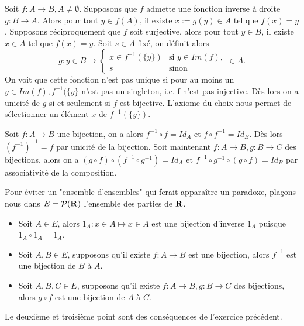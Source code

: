 \begin{exercice}
    Soit $f : A \to B, A \neq \emptyset$.
    Supposons que $f$ admette une fonction inverse à droite $g : B \to A$. Alors pour tout $y \in f(A)$, il existe 
    $x := g(y) \in A$ tel que $f(x) = y$. Supposons réciproquement que $f$ soit surjective, alors pour tout $y \in B$, il
    existe $x \in A$ tel que $f(x) = y$. Soit $s \in A$ fixé, on définit alors 
    \[
        g : y \in B \mapsto 
        \begin{cases}
            x \in f^{-1}(\{y\}) & \text{si } y \in Im(f),\\
            s & \text{sinon}
        \end{cases} \in A.
    \]
    On voit que cette fonction n'est pas unique si pour au moins un $y \in Im(f), f^{-1}(\{y\}$ n'est pas un singleton,
    i.e. f n'est pas injective. Dès lors on a unicité de $g$ si et seulement si $f$ est bijective. L'axiome du choix nous 
    permet de sélectionner un élément $x$ de $f^{-1}(\{y\})$.
    
\end{exercice}

\begin{exercice}
    Soit $f : A \to B$ une bijection, on a alors $f^{-1} \circ f = Id_A$ et $f \circ f^{-1} = Id_B$. Dès lors $(f^{-1})^{-1} = f$ par 
    unicité de la bijection.
    Soit maintenant $f : A \to B, g : B \to C$ des bijections, alors on a $(g \circ f) \circ (f^{-1} \circ g^{-1}) = Id_A$ et 
    $f^{-1} \circ g^{-1} \circ (g \circ f) = Id_B$ par associativité de la composition.
\end{exercice}

\begin{exercice}
    Pour éviter un "ensemble d'ensembles" qui ferait apparaître un paradoxe, plaçons-nous dans $E = \mathcal{P}(\mathbf{R})$ l'ensemble des parties
    de $\mathbf{R}$.
    \begin{itemize}
        \item Soit $A \in E$, alors $1_A : x \in A \mapsto x \in A$ est une bijection d'inverse $1_A$ puisque $1_A \circ 1_A = 1_A$.
        \item Soit $A,B \in E$, supposons qu'il existe $f : A \to B$ est une bijection, alors $f^{-1}$ est une bijection de $B$ à $A$.
        \item Soit $A,B,C \in E$, supposons qu'il existe $f : A \to B, g : B \to C$ des bijections, alors $g \circ f$ est une bijection
        de $A$ à $C$.
    \end{itemize}
    Le deuxième et troisième point sont des conséquences de l'exercice précédent.
\end{exercice}